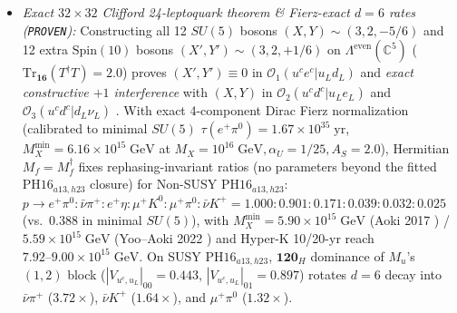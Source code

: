\documentclass[11pt,a4paper]{article}
\begin{document}
\begin{enumerate}
\begin{itemize}
        \item \emph{Exact $32\times 32$ Clifford 24-leptoquark theorem \& Fierz-exact $d=6$ rates (\texttt{PROVEN}):} Constructing all 12 $SU(5)$ bosons $(X,Y)\sim(3,2,-5/6)$ and 12 extra $\mathrm{Spin}(10)$ bosons $(X',Y')\sim(3,2,+1/6)$ on $\Lambda^{\mathrm{even}}(\mathbb{C}^5)$ ($\mathrm{Tr}_{\mathbf{16}}(T^\dagger T)=2.0$) proves $(X',Y')\equiv 0$ in $\mathcal{O}_1(u^c e^c|u_L d_L)$ and \emph{exact constructive $+1$ interference} with $(X,Y)$ in $\mathcal{O}_2(u^c d^c|u_L e_L)$ and $\mathcal{O}_3(u^c d^c|d_L\nu_L)$ \cite{NathPerez2007}. With exact 4-component Dirac Fierz normalization (calibrated to minimal $SU(5)$ $\tau(e^+\pi^0)=1.67\times 10^{35}\;\mathrm{yr}$, $M_X^{\min}=6.16\times 10^{15}\;\mathrm{GeV}$ at $M_X=10^{16}\;\mathrm{GeV}, \alpha_U=1/25, A_S=2.0$), Hermitian $M_f = M_f^\dagger$ fixes rephasing-invariant ratios (no parameters beyond the fitted $\mathrm{PH16}_{a13,h23}$ closure) for Non-SUSY $\mathrm{PH16}_{a13,h23}$: $p\to e^+\pi^0 : \bar\nu\pi^+ : e^+\eta : \mu^+ K^0 : \mu^+\pi^0 : \bar\nu K^+ = 1.000 : 0.901 : 0.171 : 0.039 : 0.032 : 0.025$ (vs.\ $0.388$ in minimal $SU(5)$), with $M_X^{\min}=5.90\times 10^{15}\;\mathrm{GeV}$ (Aoki 2017 \cite{Aoki2017}) / $5.59\times 10^{15}\;\mathrm{GeV}$ (Yoo--Aoki 2022 \cite{Aoki2022}) and Hyper-K 10/20-yr reach $7.92\text{--}9.00\times 10^{15}\;\mathrm{GeV}$. On SUSY $\mathrm{PH16}_{a13,h23}$, $\mathbf{120}_H$ dominance of $M_u$'s $(1,2)$ block ($|V_{u^c,u_L}|_{00}=0.443$, $|V_{u^c,u_L}|_{01}=0.897$) rotates $d=6$ decay into $\bar\nu\pi^+$ ($3.72\times$), $\bar\nu K^+$ ($1.64\times$), and $\mu^+\pi^0$ ($1.32\times$).

\end{itemize}
\end{enumerate}
\end{document}
